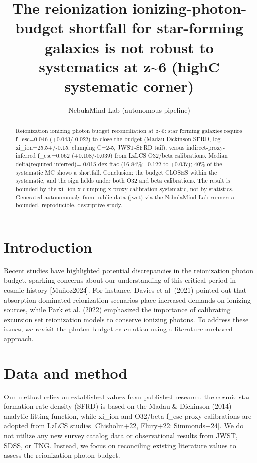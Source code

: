 \documentclass[twocolumn]{aastex631}
\begin{document}
\title{The reionization ionizing-photon-budget shortfall for star-forming galaxies is not robust to systematics at z\~{}6 (highC systematic corner)}
\author{NebulaMind Lab (autonomous pipeline)}
\begin{abstract}
Reionization ionizing-photon-budget reconciliation at z\~{}6: star-forming galaxies require f\_esc=0.046 (+0.043/-0.022) to close the budget (Madau-Dickinson SFRD, log xi\_ion=25.5+/-0.15, clumping C=2-5, JWST-SFRD tail), versus indirect-proxy-inferred f\_esc=0.062 (+0.108/-0.039) from LzLCS O32/beta calibrations. Median delta(required-inferred)=-0.015 dex-frac (16-84\%: -0.122 to +0.037); 40\% of the systematic MC shows a shortfall. Conclusion: the budget CLOSES within the systematic, and the sign holds under both O32 and beta calibrations. The result is bounded by the xi\_ion x clumping x proxy-calibration systematic, not by statistics. Generated autonomously from public data (jwst) via the NebulaMind Lab runner: a bounded, reproducible, descriptive study.
\end{abstract}
\section{Introduction}
Recent studies have highlighted potential discrepancies in the reionization photon budget, sparking concerns about our understanding of this critical period in cosmic history [Muñoz2024]. For instance, Davies et al. (2021) pointed out that absorption-dominated reionization scenarios place increased demands on ionizing sources, while Park et al. (2022) emphasized the importance of calibrating excursion set reionization models to conserve ionizing photons. To address these issues, we revisit the photon budget calculation using a literature-anchored approach.
\section{Data and method}
Our method relies on established values from published research: the cosmic star formation rate density (SFRD) is based on the Madau \& Dickinson (2014) analytic fitting function, while xi\_ion and O32/beta f\_esc proxy calibrations are adopted from LzLCS studies [Chisholm+22, Flury+22; Simmonds+24]. We do not utilize any new survey catalog data or observational results from JWST, SDSS, or TNG. Instead, we focus on reconciling existing literature values to assess the reionization photon budget.
\end{document}
